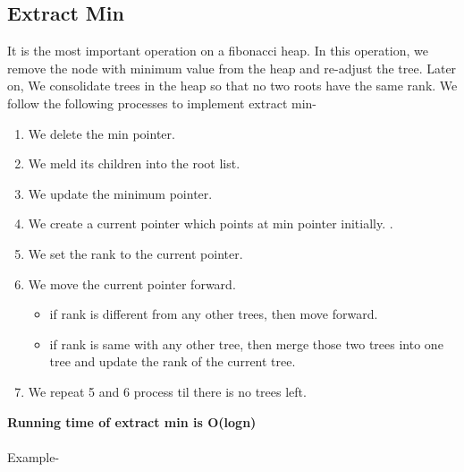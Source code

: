 \documentclass[14pt,a4paper]{report}
\begin{document}
\subsection{Extract Min}
It is the most important operation on a fibonacci heap. In this operation, we remove the node with minimum value from the heap and re-adjust the tree. Later on, We consolidate trees in the heap so that no two roots have the same rank. We follow the following processes to implement extract min-
\begin{enumerate}
    \item  We delete the min pointer.
    \item We meld its children into the root list.
    \item We update the minimum pointer.
    \item We create a current pointer which points at min pointer initially.
.   \item We set the rank to the current pointer.
    \item We move the current pointer forward.
    \begin{itemize}
         \item if rank is different from any other trees, then move forward.
        \item if rank is same with any other tree, then merge those two trees into one tree and update the rank of the current tree.
    \end{itemize}
    \item We repeat 5 and 6 process  til there is no trees left.
\end{enumerate}
\textbf{Running time of extract min is O(logn)}\\\\
\vspace{0.5cm}
Example-\\
\end{document}
